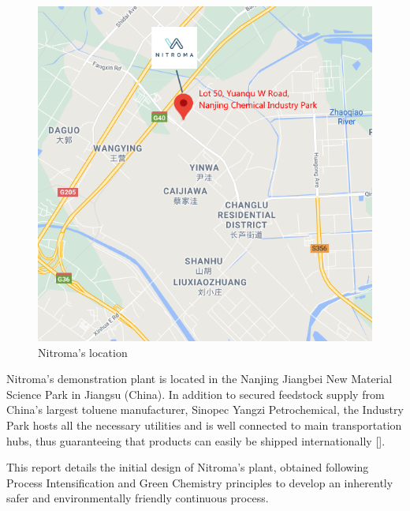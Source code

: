 \begin{figure}
    \centering
    \includegraphics[width=0.2\linewidth]{chapters/0-executive-summary/figures/Location-crop.png}
    \caption{Nitroma's location}
    \label{fig:location}
\end{figure}
Nitroma's demonstration plant is located in the Nanjing Jiangbei New Material Science Park in Jiangsu (China). In addition to secured feedstock supply from China’s largest toluene manufacturer, Sinopec Yangzi Petrochemical, the Industry Park hosts all the necessary utilities and is well connected to main transportation hubs, thus guaranteeing that products can easily be shipped internationally []. 


This report details the initial design of Nitroma's plant, obtained following Process Intensification and Green Chemistry principles to develop an inherently safer and environmentally friendly continuous process.



